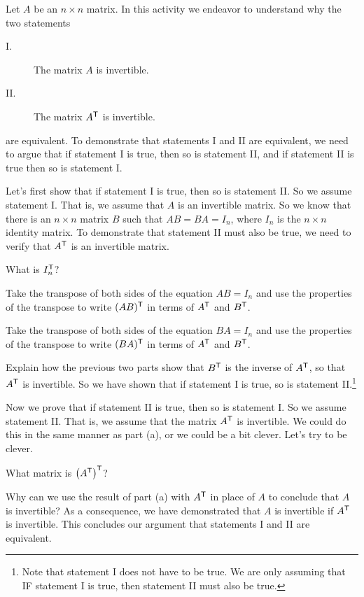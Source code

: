\begin{pa} \label{pa:2_d} Let $A$ be an $n \times n$ matrix. In this activity we endeavor to understand why the two statements
\begin{description}
\item[I.] The matrix $A$ is invertible.
\item[II.] The matrix $A^{\mathsf{T}}$ is invertible. 
\end{description}
are equivalent. To demonstrate that statements I and II are equivalent, we need to argue that if statement I is true, then so is statement II, and if statement II is true then so is statement I. 
\be
\item Let's first show that if statement I is true, then so is statement II. So we assume statement I. That is, we assume that $A$ is an invertible matrix. So we know that there is an $n \times n$ matrix $B$ such that $AB = BA = I_n$, where $I_n$ is the $n \times n$ identity matrix. To demonstrate that statement II must also be true, we need to verify that $A^{\mathsf{T}}$ is an invertible matrix. 
	\ba
	\item What is $I_n^{\mathsf{T}}$? 


	\item Take the transpose of both sides of the equation $AB = I_n$ and use the properties of the transpose to write $(AB)^{\mathsf{T}}$ in terms of $A^{\mathsf{T}}$ and $B^{\mathsf{T}}$. 
	

	\item Take the transpose of both sides of the equation $BA = I_n$ and use the properties of the transpose to write $(BA)^{\mathsf{T}}$ in terms of $A^{\mathsf{T}}$ and $B^{\mathsf{T}}$. 
	
	
	\item Explain how the previous two parts show that $B^{\mathsf{T}}$ is the inverse of $A^{\mathsf{T}}$, so that $A^{\mathsf{T}}$ is invertible. So we have shown that if statement I is true, so is statement II.\footnote{Note that statement I does not have to be true. We are only assuming that IF statement I is true, then statement II must also be true.}


	\ea
	
\item Now we prove that if statement II is true, then so is statement I. So we assume statement II. That is, we assume that the matrix $A^{\mathsf{T}}$ is invertible. We could do this in the same manner as part (a), or we could be a bit clever. Let's try to be clever.

	\ba
	\item What matrix is $\left(A^{\mathsf{T}}\right)^{\mathsf{T}}$? 

	
	\item Why can we use the result of part (a) with $A^{\mathsf{T}}$ in place of $A$ to conclude that $A$ is invertible? As a consequence, we have demonstrated that $A$ is invertible if $A^{\mathsf{T}}$ is invertible. This concludes our argument that statements I and II are equivalent. 
	
	\ea

\ee

\end{pa}



